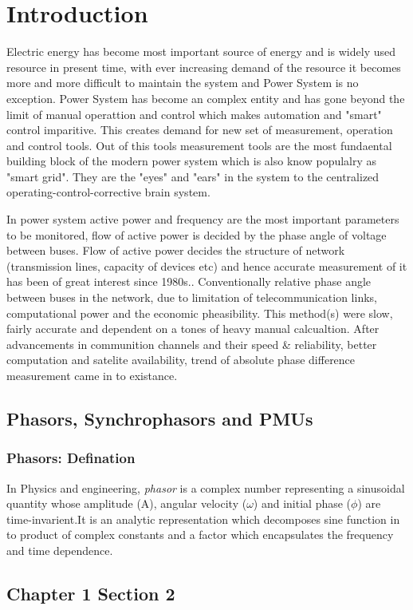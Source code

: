 \chapter{Introduction}
\setcounter{page}{1}

Electric energy has become most important source of energy and is widely used resource in present time, with ever increasing demand of the resource it becomes more and more difficult to maintain the system and Power System is no exception. Power System has become an complex entity and has gone beyond the limit of manual operattion and control which makes automation and "smart" control imparitive. This creates demand for new set of measurement, operation and control tools. Out of this tools measurement tools are the most fundaental building block of the modern power system which is also know populalry as "smart grid". They are the "eyes" and "ears" in the system to the centralized operating-control-corrective brain system.  

In power system active power and frequency are the most important parameters to be monitored, flow of active power is decided by the phase angle of voltage between buses. Flow of active power decides the structure of network (transmission lines, capacity of devices etc) and hence accurate measurement of it has been of great interest since 1980s.\cite{agphadkebook}. Conventionally relative phase angle between buses in the network, due to limitation of telecommunication links, computational power and the economic pheasibility. This method(s) were slow, fairly accurate and dependent on a tones of heavy manual calcualtion. 
After advancements in communition channels and their speed \& reliability, better computation and satelite availability, trend of absolute phase difference measurement came in to existance.   
\section{Phasors, Synchrophasors and PMUs}
\subsection{Phasors: Defination}
In Physics and engineering, \textit{phasor} is a complex number representing a sinusoidal quantity whose amplitude (A), angular velocity ($\omega$) and initial phase ($\phi$) are time-invarient.It is an analytic representation which decomposes sine function in to product of complex constants and a factor which encapsulates the frequency and time dependence.
\section{Chapter 1 Section 2}
